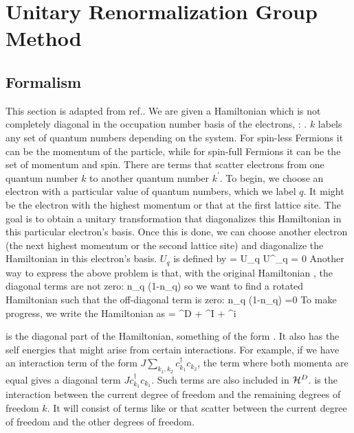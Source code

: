 \documentclass[14pt]{extarticle}
\numberwithin{equation}{section}
\begin{document}
\section{Unitary Renormalization Group Method}\label{section2}
\subsection{Formalism}\label{urgform}
This section is adapted from ref.\cite{holography1}.
We are given a Hamiltonian \il{\ham} which is not completely diagonal in the occupation number basis of the electrons, : . \(k\) labels any set of quantum numbers depending on the system. For spin-less Fermions it can be the momentum of the particle, while for spin-full Fermions it can be the set of momentum and spin. There are terms that scatter electrons from one quantum number \(k\) to another quantum number \(k^\prime\).
\pb To begin, we choose an electron with a particular value of quantum numbers, which we label \(q\). It might be the electron with the highest momentum or that at the first lattice site. The goal is to obtain a unitary transformation  that diagonalizes this Hamiltonian in this particular electron's basis. Once this is done, we can choose another electron (the next highest momentum or the second lattice site) and diagonalize the Hamiltonian in this electron's basis.
\pb \(U_q\) is defined by
\beq
\tilde \ham = U_q \ham U^\dagger_q   = 0
\eeq
Another way to express the above problem is that, with the original Hamiltonian \il{\ham}, the diagonal terms are not zero:
\beq
n_q \ham(1-n_q) 
\eeq
so we want to find a rotated Hamiltonian  such that the off-diagonal term is zero:
\beq[solve]
n_q \tilde \ham(1-n_q) =0
\eeq
To make progress, we write the Hamiltonian \il{\ham} as
\beq[ham]
\ham = \ham^D + \ham^I + \ham^i 
\eeq
\begin{minipage}{310pt}
	 is the diagonal part of the Hamiltonian, something of the form .
It also has the self energies that might arise from certain interactions.
For example, if we have an interaction term of the form \(J \sum_{k_1,k_2}c^\dagger_{k_1}c_{k_2}\), the term where both momenta are equal gives a diagonal term \(J c^\dagger_{k_1}c_{k_1}\).
Such terms are also included in \(\mathcal{H}^D\).
\pb {} is the interaction between the current degree of freedom  and the remaining degrees of freedom \(k\).
It will consist of terms like  or  that scatter between the current degree of freedom and the other degrees of freedom.
\end{minipage}
\end{document}
